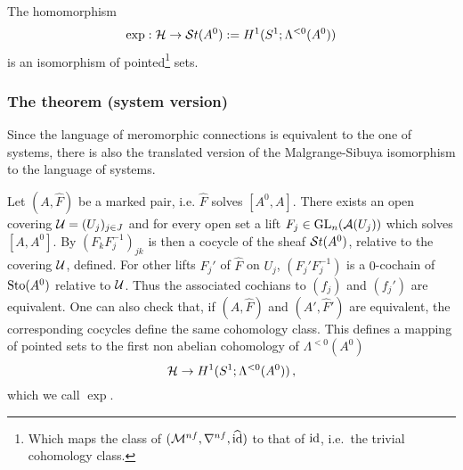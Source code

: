 \begin{tthm} \label{thm:mainThm1}
  The homomorphism
  \[
    \exp:\mathcal{H}\to\mathcal{S}{}t(A^0):=H^1(S^1;\Lambda^{<0}(A^0))
  \]
  is an isomorphism of pointed\footnote{Which maps the class of
  $(\mathcal{M}^{nf},\nabla^{nf},\widehat{\operatorname{id}})$ to that of $\operatorname{id}$, i.e.\ the trivial
  cohomology class.} sets.
\end{tthm}
\begin{comment}
  \begin{rem}
    \marginnote{\cite{Loday1994} Remark I.2.2}
    To another normal form $A^1={}^\Phi\!A^0$ there correspond cochains which
    are conjugated via $\Phi$.
    We get the following commutative diagram:
    \[ \begin{tikzcd}
        G\backslash\hat G(A^1) \rar{\cdot\Phi}\dar{\exp}
        & G\backslash\hat G(A^0) \dar{\exp}
        & \hat F \arrow[|->]{r}\arrow[|->]{d}
        & \hat F\Phi \arrow[|->]{d}
      \\ H^1(S^1;\lambda(A^1)) \rar
        & H^1(S^1;\lambda(A^0))
        & \exp_{\mu_1}(\hat F) \arrow[|->]{r}
        & \exp_{\mu_0}(\hat F\Phi)
    \end{tikzcd} \]
    where $\exp_{\mu_0}(\hat F\Phi)=\Phi^{-1}\exp_{\mu_0}(\hat F)\Phi$.
  \end{rem}
\end{comment}

\subsubsection{The theorem (system version)}
Since the language of meromorphic connections is equivalent to the one of
systems, there is also the translated version of the Malgrange-Sibuya
isomorphism to the language of systems.
\begin{comment}
  \begin{itemize}
    \item \TODO[See \cite{thboalch} for sheaf-less definition]
  \end{itemize}
\end{comment}
Let $(A,\hat F)$ be a marked pair, i.e. $\hat F$ solves $[A^0,A]$.
There exists an open covering $\mathcal{U}=(U_j)_{j\in J}$ and for every open set
a lift $F_j\in\operatorname{GL}_n(\mathcal{A}(U_j))$ which solves $[A,A^0]$.
By $(F_kF_j^{-1})_{jk}$ is then a cocycle of the sheaf $\mathcal{S}{}t(A^0)$, relative to
the covering $\mathcal{U}$, defined.
For other lifts $F_j'$ of $\hat F$ on $U_j$, $(F_j'F_j^{-1})$ is a $0$-cochain
of $\operatorname{Sto}(A^0)$ relative to $\mathcal{U}$.
Thus the associated cochians to $(f_j)$ and $(f_j')$ are equivalent.
One can also check that, if $(A,\hat F)$ and $(A',\hat F')$ are equivalent, the
corresponding cocycles define the same cohomology class.
This defines a mapping of pointed sets to the first non abelian cohomology of
$\Lambda^{<0}(A^0)$
\[
  \mathcal{H}\to H^1(S^1;\Lambda^{<0}(A^0)) \,,
\]
which we call $\exp$.

